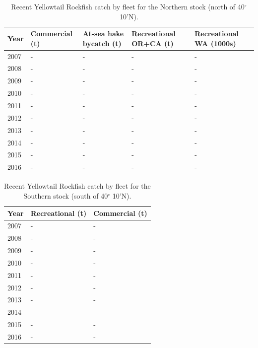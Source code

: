 \documentclass[12pt,]{article}
\begin{document}
\begin{table}[ht]
\centering
\caption{Recent Yellowtail Rockfish catch by 
                                             fleet for the Northern stock 
                                             (north of 40$^\circ$ 10'N).} 
\label{tab:Exec_catch_N}
\begin{tabular}{l>{\centering}p{1.0in}>{\centering}p{1.0in}>{\centering}p{1.0in}>{\centering}p{1.0in}}
  \hline
Year & Commercial (t) & At-sea hake bycatch (t) & Recreational OR+CA (t) & Recreational WA (1000s) \\ 
  \hline
2007 & - & - & - & - \\ 
  2008 & - & - & - & - \\ 
  2009 & - & - & - & - \\ 
  2010 & - & - & - & - \\ 
  2011 & - & - & - & - \\ 
  2012 & - & - & - & - \\ 
  2013 & - & - & - & - \\ 
  2014 & - & - & - & - \\ 
  2015 & - & - & - & - \\ 
  2016 & - & - & - & - \\ 
   \hline
\end{tabular}
\end{table}

\begin{table}[ht]
\centering
\caption{Recent Yellowtail Rockfish catch by 
                                            fleet for the Southern stock 
                                             (south of 40$^\circ$ 10'N).} 
\label{tab:Exec_catch_S}
\begin{tabular}{l>{\centering}p{1.5in}>{\centering}p{1.5in}}
  \hline
Year & Recreational (t) & Commercial (t) \\ 
  \hline
2007 & - & - \\ 
  2008 & - & - \\ 
  2009 & - & - \\ 
  2010 & - & - \\ 
  2011 & - & - \\ 
  2012 & - & - \\ 
  2013 & - & - \\ 
  2014 & - & - \\ 
  2015 & - & - \\ 
  2016 & - & - \\ 
   \hline
\end{tabular}
\end{table}
\end{document}
